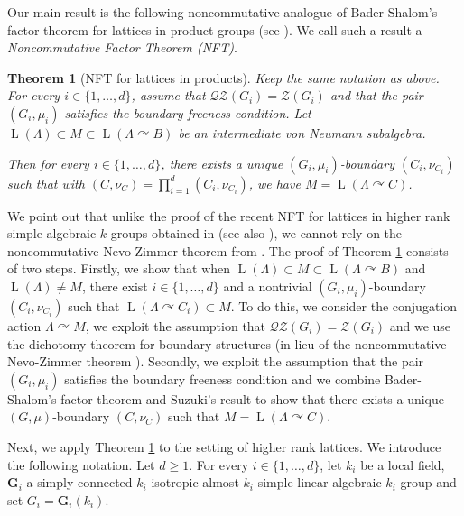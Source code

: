 \documentclass[JEP,XML,SOM,Unicode,published]{cedram}
\newcommand{\bG}{\boldsymbol{G}}
\newtheorem{letterthm}{Theorem}
\theoremstyle{definition}
\DeclareMathOperator{\rL}{L}
\begin{document}
Our main result is the following noncommutative analogue of Bader-Shalom's factor theorem for lattices in product groups (see \cite[Th.\,1.7]{BS04}). We call such a result a \emph{Noncommutative Factor Theorem (NFT)}.

\begin{letterthm}[NFT for lattices in products]\label{thmA}
Keep the same notation as above. For every $i \in \{1, \dots, d\}$, assume that $\mathscr{Q}\mathscr{Z}(G_i) = \mathscr Z(G_i)$ and that the pair $(G_i, \mu_i)$ satisfies the boundary freeness condition. Let $\rL(\Lambda) \subset M \subset \rL(\Lambda \curvearrowright B)$ be an intermediate von Neumann subalgebra.

Then for every $i \in \{1, \dots, d\}$, there exists a unique $(G_i, \mu_i)$-boundary $(C_i, \nu_{C_i})$ such that with $(C, \nu_C) = \prod_{i = 1}^d (C_i, \nu_{C_i})$, we have $M = \rL(\Lambda \curvearrowright C)$.
\end{letterthm}

We point out that unlike the proof of the recent NFT for lattices in higher rank simple algebraic $k$-groups obtained in \cite{BBH21} (see also \cite{Ho21}), we cannot rely on the noncommutative Nevo-Zimmer theorem from \cite{BH19, BBH21}. The proof of Theorem \ref{thmA} consists of two steps. Firstly, we show that when $\rL(\Lambda) \subset M \subset \rL(\Lambda \curvearrowright B)$ and $\rL(\Lambda) \neq M$, there exist $i \in \{1, \dots, d\}$ and a nontrivial $(G_i, \mu_i)$-boundary $(C_i, \nu_{C_i})$ such that $\rL(\Lambda \curvearrowright C_i) \subset M$. To do this, we consider the conjugation action $\Lambda \curvearrowright M$, we exploit the assumption that $\mathscr{Q}\mathscr{Z}(G_i) = \mathscr Z(G_i)$ and we use the dichotomy theorem for boundary structures \cite[Th.\,5.8]{BBHP20} (in lieu of the noncommutative Nevo-Zimmer theorem \cite{BH19, BBH21}). Secondly, we exploit the assumption that the pair $(G_i, \mu_i)$ satisfies the boundary freeness condition and we combine Bader-Shalom's factor theorem \cite{BS04} and Suzuki's result \cite{Su18} to show that there exists a unique $(G, \mu)$-boundary $(C, \nu_C)$ such that $M = \rL(\Lambda \curvearrowright C)$.

Next, we apply Theorem \ref{thmA} to the setting of higher rank lattices. We introduce the following notation. Let $d \geq 1$. For every $i \in \{1, \dots, d\}$, let $k_i$ be a local field, $\bG_i$ a simply connected $k_i$-isotropic almost $k_i$-simple linear algebraic $k_i$-group and set $G_i = \bG_i(k_i)$.
\end{document}
